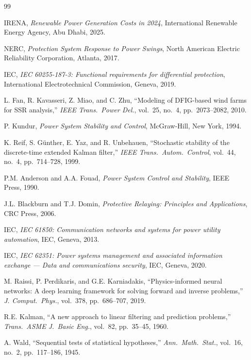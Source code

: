 \documentclass[11pt,a4paper]{report}
\begin{document}
\begin{thebibliography}{99}

IRENA, \textit{Renewable Power Generation Costs in 2024}, International Renewable Energy Agency, Abu Dhabi, 2025.

NERC, \textit{Protection System Response to Power Swings}, North American Electric Reliability Corporation, Atlanta, 2017.

IEC, \textit{IEC 60255-187-3: Functional requirements for differential protection}, International Electrotechnical Commission, Geneva, 2019.

L. Fan, R. Kavasseri, Z. Miao, and C. Zhu, ``Modeling of DFIG-based wind farms for SSR analysis,'' \textit{IEEE Trans.\ Power Del.}, vol.~25, no.~4, pp.~2073--2082, 2010.

P. Kundur, \textit{Power System Stability and Control}, McGraw-Hill, New York, 1994.

K. Reif, S. Günther, E. Yaz, and R. Unbehauen, ``Stochastic stability of the discrete-time extended Kalman filter,'' \textit{IEEE Trans.\ Autom.\ Control}, vol.~44, no.~4, pp.~714--728, 1999.

P.M. Anderson and A.A. Fouad, \textit{Power System Control and Stability}, IEEE Press, 1990.

J.L. Blackburn and T.J. Domin, \textit{Protective Relaying: Principles and Applications}, CRC Press, 2006.

IEC, \textit{IEC 61850: Communication networks and systems for power utility automation}, IEC, Geneva, 2013.

IEC, \textit{IEC 62351: Power systems management and associated information exchange — Data and communications security}, IEC, Geneva, 2020.

M. Raissi, P. Perdikaris, and G.E. Karniadakis, ``Physics-informed neural networks: A deep learning framework for solving forward and inverse problems,'' \textit{J. Comput.\ Phys.}, vol.~378, pp.~686--707, 2019.

R.E. Kalman, ``A new approach to linear filtering and prediction problems,'' \textit{Trans.\ ASME J.\ Basic Eng.}, vol.~82, pp.~35--45, 1960.

A. Wald, ``Sequential tests of statistical hypotheses,'' \textit{Ann.\ Math.\ Stat.}, vol.~16, no.~2, pp.~117--186, 1945.


\end{thebibliography}
\end{document}

